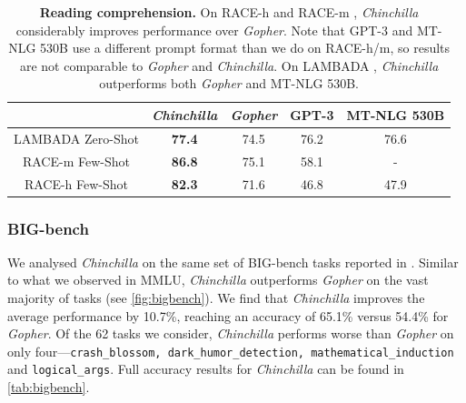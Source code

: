 \documentclass[11pt, a4paper, logo, copyright, nonumbering]{deepmind}
\newcommand{\gopher}{\textit{Gopher}\xspace}
\newcommand{\chinchilla}{\textit{Chinchilla}\xspace}
\newcommand{\mtnlg}{MT-NLG 530B\xspace}
\newcommand{\bigbench}{BIG-bench\xspace}
\begin{document}
\begin{table}[t]
    \centering
    \begin{tabular}{ccccc}
    \toprule
    & \chinchilla & \gopher & GPT-3 & \mtnlg \\
    \midrule
    LAMBADA Zero-Shot & \textbf{77.4} & 74.5 & 76.2 & 76.6 \\
    RACE-m Few-Shot & \textbf{86.8}  & 75.1 & 58.1 & - \\
    RACE-h Few-Shot & \textbf{82.3} & 71.6 & 46.8 & 47.9\\
    \bottomrule
    \end{tabular}
    \caption{\textbf{Reading comprehension.}
    On RACE-h and RACE-m \citep{race}, \chinchilla considerably improves performance over \gopher. Note that GPT-3 and \mtnlg use a different prompt format than we do on RACE-h/m, so results are not comparable to \gopher and \chinchilla.
    On LAMBADA \citep{paperno2016lambada}, \chinchilla outperforms both \gopher and \mtnlg.}
    \label{tab:reading}
\end{table}
\subsubsection{\bigbench}
We analysed \chinchilla on the same set of \bigbench tasks \citep{bigbench} reported in \citet{rae2021gopher}. 
Similar to what we observed in MMLU, \chinchilla outperforms \gopher on the vast majority of tasks (see \autoref{fig:bigbench}). 
We find that \chinchilla improves the average performance by 10.7\%, reaching an accuracy of 65.1\% versus 54.4\% for \gopher.
Of the 62 tasks we consider, \chinchilla performs worse than \gopher on only four---\texttt{crash\_blossom, dark\_humor\_detection, mathematical\_induction} and \texttt{logical\_args}. 
Full accuracy results for \chinchilla can be found in \autoref{tab:bigbench}.
\end{document}
